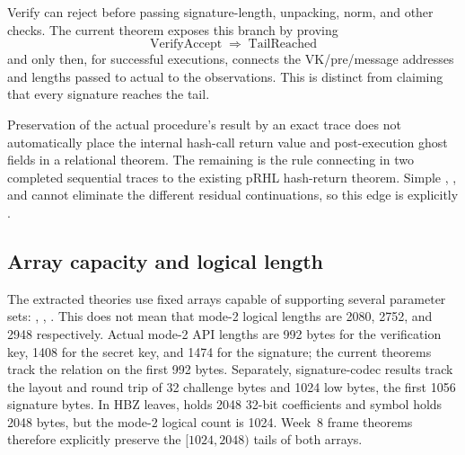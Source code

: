Verify can reject before passing signature-length, unpacking, norm, and
other checks. The current theorem exposes this branch by proving
\[
  \operatorname{VerifyAccept}\Longrightarrow\operatorname{TailReached}
\]
and only then, for successful executions, connects the VK/pre/message
addresses and lengths passed to actual  to the
observations. This is distinct from claiming that every signature reaches the tail.

Preservation of the actual procedure's result by an exact trace does not
automatically place the internal hash-call return value and post-execution
ghost fields in a relational theorem. The remaining
 is the rule connecting
 in two completed sequential traces to the existing
pRHL hash-return theorem. Simple , , and
 cannot eliminate the different residual continuations,
so this edge is explicitly \statusdeferred.

\subsection{Array capacity and logical length}

The extracted theories use fixed arrays capable of supporting several parameter sets:
, ,
. This does not mean that mode-2 logical lengths
are 2080, 2752, and 2948 respectively. Actual mode-2 API lengths are 992 bytes
for the verification key, 1408 for the secret key, and 1474 for the signature;
the current theorems track the relation on the first 992 bytes. Separately,
signature-codec results track the layout and round trip of 32 challenge bytes
and 1024 low bytes, the first 1056 signature bytes. In HBZ leaves,
 holds 2048 32-bit coefficients and symbol
 holds 2048 bytes, but the mode-2 logical count is 1024.
Week~8 frame theorems therefore explicitly preserve the \([1024,2048)\) tails
of both arrays.
